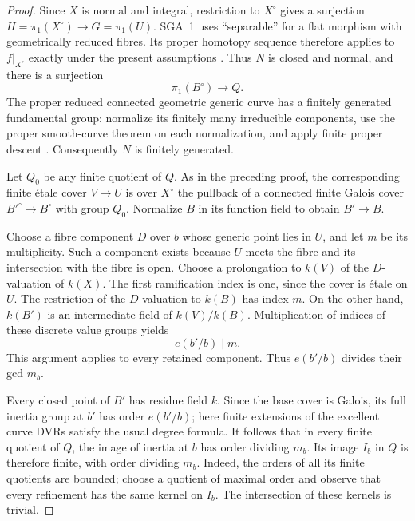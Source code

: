 \begin{proof}
Since $X$ is normal and integral, restriction to $X^\circ$
gives a surjection $H=\pi_1(X^\circ)\to G=\pi_1(U)$.
SGA~1 uses ``separable'' for a flat morphism with geometrically
reduced fibres.  Its proper homotopy sequence therefore applies
to $f|_{X^\circ}$ exactly under the present assumptions
\cite[X, Definition 1.1 and Corollary 1.4, pp. 261--263]{SGA1}.
Thus $N$ is closed and normal, and there is a surjection
\[
                    \pi_1(B^\circ)\longrightarrow Q.
\]
The proper reduced connected geometric generic curve has a
finitely generated fundamental group: normalize its finitely
many irreducible components, use the proper smooth-curve theorem
on each normalization, and apply finite proper descent
\cite[IX, Corollary 5.2; X, Theorem 2.6]{SGA1}.
Consequently $N$ is finitely generated.

Let $Q_0$ be any finite quotient of $Q$.  As in the preceding
proof, the corresponding finite \'etale cover $V\to U$ is over
$X^\circ$ the pullback of a connected finite Galois cover
$B'^\circ\to B^\circ$ with group $Q_0$.  Normalize $B$ in its
function field to obtain $B'\to B$.

Choose a fibre component $D$ over $b$ whose generic point lies
in $U$, and let $m$ be its multiplicity.  Such a component
exists because $U$ meets the fibre and its intersection with
the fibre is open.  Choose a prolongation to $k(V)$ of the
$D$-valuation of $k(X)$.  The first ramification index is one,
since the cover is \'etale on $U$.  The restriction of the
$D$-valuation to $k(B)$ has index $m$.  On the other hand,
$k(B')$ is an intermediate field of $k(V)/k(B)$.  Multiplication
of indices of these discrete value groups yields
\[
                         e(b'/b)\mid m.
\]
This argument applies to every retained component.  Thus
$e(b'/b)$ divides their gcd $m_b$.

Every closed point of $B'$ has residue field $k$.  Since the
base cover is Galois, its full inertia group at $b'$ has order
$e(b'/b)$; here finite extensions of the excellent curve DVRs
satisfy the usual degree formula.  It follows that in every
finite quotient of $Q$, the image of inertia at $b$ has order
dividing $m_b$.  Its image $I_b$ in $Q$ is therefore finite,
with order dividing $m_b$.  Indeed, the orders of all its finite
quotients are bounded; choose a quotient of maximal order and
observe that every refinement has the same kernel on $I_b$.
The intersection of these kernels is trivial.


\end{proof}
